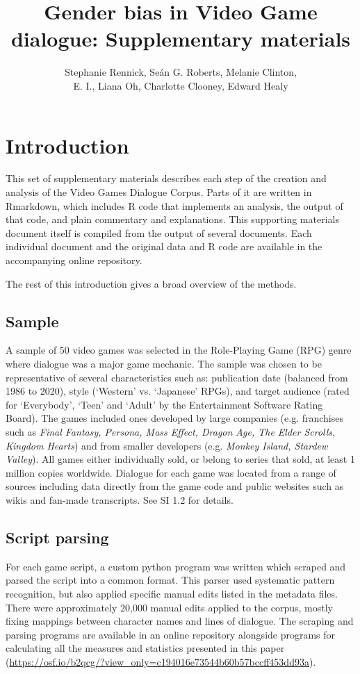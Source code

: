 \documentclass[12pt,a4paper]{article}
\author{Stephanie Rennick, Se\'{a}n G. Roberts, Melanie Clinton,\\E. I., Liana Oh, Charlotte Clooney, Edward Healy}
\title{Gender bias in Video Game dialogue: Supplementary materials}
\begin{document}
\maketitle
\tableofcontents

\clearpage
\newpage

\section{Introduction}

This set of supplementary materials describes each step of the creation and analysis of the Video Games Dialogue Corpus. Parts of it are written in Rmarkdown, which includes R code that implements an analysis, the output of that code, and plain commentary and explanations. This supporting materials document itself is compiled from the output of several documents. Each individual document and the original data and R code are available in the accompanying online repository.

The rest of this introduction gives a broad overview of the methods.

\subsection*{Sample}

A sample of 50 video games was selected in the Role-Playing Game (RPG) genre where dialogue was a major game mechanic. The sample was chosen to be representative of several characteristics such as: publication date (balanced from 1986 to 2020), style (`Western' vs. `Japanese' RPGs), and target audience (rated for `Everybody', `Teen' and `Adult' by the Entertainment Software Rating Board). The games included ones developed by large companies (e.g. franchises such as \emph{Final Fantasy, Persona, Mass Effect, Dragon Age, The Elder Scrolls, Kingdom Hearts}) and from smaller developers (e.g. \emph{Monkey Island, Stardew Valley}). All games either individually sold, or belong to series that sold, at least 1 million copies worldwide. Dialogue for each game was located from a range of sources including data directly from the game code and public websites such as wikis and fan-made transcripts. See SI 1.2 for details.

\subsection*{Script parsing}
For each game script, a custom python program was written which scraped and parsed the script into a common format. This parser used systematic pattern recognition, but also applied specific manual edits listed in the metadata files. There were approximately 20,000 manual edits applied to the corpus, mostly fixing mappings between character names and lines of dialogue. The scraping and parsing programs are available in an online repository alongside programs for calculating all the measures and statistics presented in this paper (\url{https://osf.io/b2qcg/?view_only=c194016e73544b60b57bccff453dd93a}). %
\end{document}
